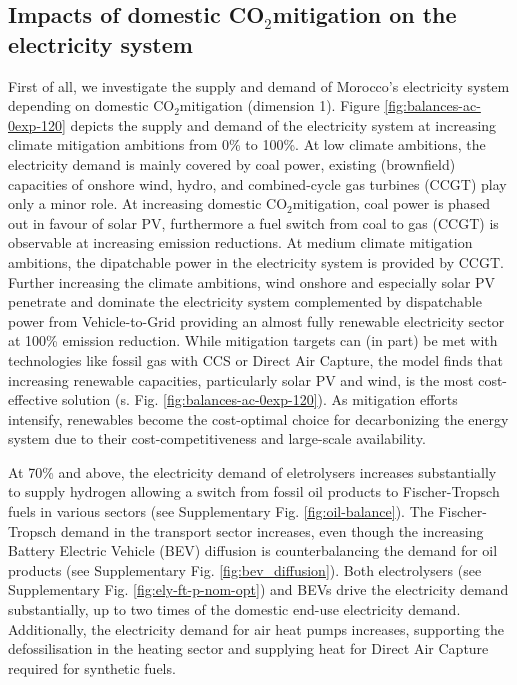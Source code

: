 \documentclass[5p,numafflabel]{elsarticle}
\newcommand{\co}{\ce{CO2}~}
\def\co{CO${}_2${\:}}
\begin{document}
\subsection*{Impacts of domestic \co mitigation on the electricity system}
\label{subsec:increase_limit}
First of all, we investigate the supply and demand of Morocco's electricity system depending on domestic \co mitigation (dimension 1). Figure \ref{fig:balances-ac-0exp-120} depicts the supply and demand of the electricity system at increasing climate mitigation ambitions from 0\% to 100\%. At low climate ambitions, the electricity demand is mainly covered by coal power, existing (brownfield) capacities of onshore wind, hydro, and combined-cycle gas turbines (CCGT) play only a minor role. 
At increasing domestic \co mitigation, coal power is phased out in favour of solar PV, furthermore a fuel switch from coal to gas (CCGT) is observable at increasing emission reductions. At medium climate mitigation ambitions, the dipatchable power in the electricity system is provided by CCGT. 
Further increasing the climate ambitions, wind onshore and especially solar PV penetrate and dominate the electricity system complemented by dispatchable power from Vehicle-to-Grid providing an almost fully renewable electricity sector at 100\% emission reduction. 
While mitigation targets can (in part) be met with technologies like fossil gas with CCS or Direct Air Capture, the model finds that increasing renewable capacities, particularly solar PV and wind, is the most cost-effective solution (s. Fig. \ref{fig:balances-ac-0exp-120}). As mitigation efforts intensify, renewables become the cost-optimal choice for decarbonizing the energy system due to their cost-competitiveness and large-scale availability.

At 70\% and above, the electricity demand of eletrolysers increases substantially to supply hydrogen allowing a switch from fossil oil products to Fischer-Tropsch fuels in various sectors (see Supplementary Fig. \ref{fig:oil-balance}). 
The Fischer-Tropsch demand in the transport sector increases, even though the increasing Battery Electric Vehicle (BEV) diffusion is counterbalancing the demand for oil products (see Supplementary Fig. \ref{fig:bev_diffusion}). 
Both electrolysers (see Supplementary Fig. \ref{fig:ely-ft-p-nom-opt}) and BEVs drive the electricity demand substantially, up to two times of the domestic end-use electricity demand. 
Additionally, the electricity demand for air heat pumps increases, supporting the defossilisation in the heating sector and supplying heat for Direct Air Capture required for synthetic fuels.
\end{document}
